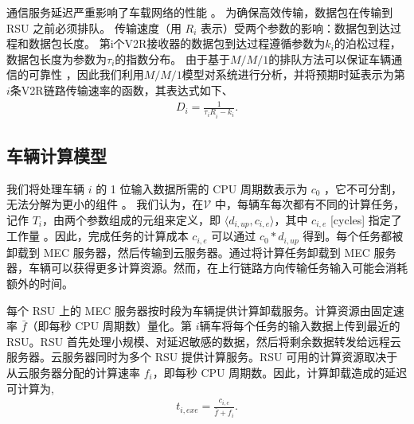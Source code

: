 通信服务延迟严重影响了车载网络的性能 \cite{RAI}。 为确保高效传输，数据包在传输到 RSU 之前必须排队。 传输速度（用 $R_i$ 表示）受两个参数的影响：数据包到达过程和数据包长度。  第i个V2R接收器的数据包到达过程遵循参数为$k_i$的泊松过程，数据包长度为参数为$\tau_i$的指数分布。 由于基于$M/M/1$的排队方法可以保证车辆通信的可靠性 \cite{Guo2019}，因此我们利用$M/M/1$模型对系统进行分析，并将预期时延表示为第$i$条V2R链路传输速率的函数，其表达式如下、
\begin{eqnarray}\label{E7}
D_i=\frac{1}{{\tau_iR}_i-k_i}.
\end{eqnarray}

\subsection{车辆计算模型}\label{section3-2-2}
我们将处理车辆 $i$ 的 1 位输入数据所需的 CPU 周期数表示为 $c_0$ \cite{Zhang2017}，它不可分割，无法分解为更小的组件 \cite{Saleem2021}。
我们认为，在$ \mathcal{V}$ 中，每辆车每次都有不同的计算任务，记作 $T_i$，由两个参数组成的元组来定义，即 $\langle d_{i,up}, c_{i,e}\rangle$，其中 $c_{i,e}$ [cycles] 指定了工作量 \cite{Tran2019}。因此，完成任务的计算成本 $c_{i,e}$ 可以通过 $c_{0}*d_{i,up}$ 得到。每个任务都被卸载到 MEC 服务器，然后传输到云服务器。通过将计算任务卸载到 MEC 服务器，车辆可以获得更多计算资源。然而，在上行链路方向传输任务输入可能会消耗额外的时间。

每个 RSU 上的 MEC 服务器按时段为车辆提供计算卸载服务。计算资源由固定速率 $\bar{f}$（即每秒 CPU 周期数）量化。第 $i $辆车将每个任务的输入数据上传到最近的 RSU。RSU 首先处理小规模、对延迟敏感的数据，然后将剩余数据转发给远程云服务器。{云服务器同时为多个 RSU 提供计算服务。RSU 可用的计算资源取决于从云服务器分配的计算速率 $f_i$，}即每秒 CPU 周期数。因此，计算卸载造成的延迟可计算为,
\begin{eqnarray}\label{E8}
t_{i,exe}=\frac{c_{i,e}}{\bar{f}+f_i}.
\end{eqnarray}
